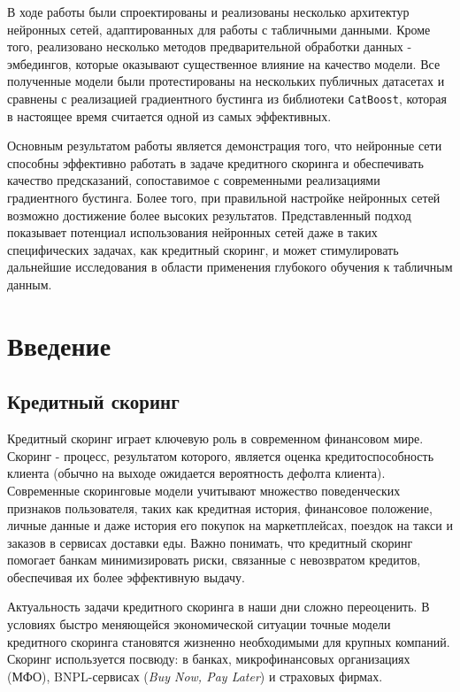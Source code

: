 \documentclass[12pt]{article}
\begin{document}
В ходе работы были спроектированы и реализованы несколько архитектур нейронных сетей, адаптированных для работы с табличными данными. Кроме того, реализовано несколько методов предварительной обработки данных - эмбедингов, которые оказывают существенное влияние на качество модели. Все полученные модели были протестированы на нескольких публичных датасетах и сравнены с реализацией градиентного бустинга из библиотеки \texttt{CatBoost}, которая в настоящее время считается одной из самых эффективных.

Основным результатом работы является демонстрация того, что нейронные сети способны эффективно работать в задаче кредитного скоринга и обеспечивать качество предсказаний, сопоставимое с современными реализациями градиентного бустинга. Более того, при правильной настройке нейронных сетей возможно достижение более высоких результатов. Представленный подход показывает потенциал использования нейронных сетей даже в таких специфических задачах, как кредитный скоринг, и может стимулировать дальнейшие исследования в области применения глубокого обучения к табличным данным.


\onehalfspacing
\setcounter{page}{2}

\newpage
{}
\tableofcontents

\newpage

\section{Введение}

\subsection{Кредитный скоринг}

Кредитный скоринг играет ключевую роль в современном финансовом мире. Скоринг - процесс, результатом которого, является оценка кредитоспособность клиента (обычно на выходе ожидается вероятность дефолта клиента). Современные скоринговые модели учитывают множество поведенческих признаков пользователя, таких как кредитная история, финансовое положение, личные данные и даже история его покупок на маркетплейсах, поездок на такси и заказов в сервисах доставки еды. Важно понимать, что кредитный скоринг помогает банкам минимизировать риски, связанные с невозвратом кредитов, обеспечивая их более эффективную выдачу.

Актуальность задачи кредитного скоринга в наши дни сложно переоценить. В условиях быстро меняющейся экономической ситуации точные модели кредитного скоринга становятся жизненно необходимыми для крупных компаний. Скоринг используется посвюду: в банках, микрофинансовых организациях (МФО), BNPL-сервисах (\textit{Buy Now, Pay Later}) и страховых фирмах.
\end{document}
